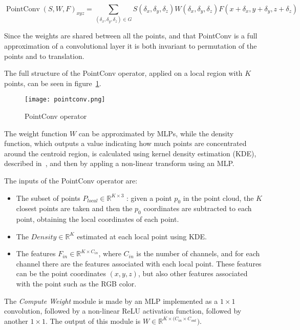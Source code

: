 \begin{equation}
    \operatorname{PointConv} (S, W, F)_{x y z}=
\sum_{\left(\delta_{x}, \delta_{y}, \delta_{z}\right) \in G} S\left(\delta_{x}, \delta_{y}, \delta_{z}\right) W\left(\delta_{x}, \delta_{y}, \delta_{z}\right) F\left(x+\delta_{x}, y+\delta_{y}, z+\delta_{z}\right)
\end{equation}

Since the weights are shared between all the points, and that PointConv is a full approximation of a convolutional layer it is both invariant to permutation of the points and to translation.

The full structure of the PointConv operator, applied on a local region with $K$ points, can be seen in figure~\ref{fig:pointconvOperator}.

\begin{figure}[ht]
    \centering
    \texttt{[image: pointconv.png]}
    \caption{PointConv operator~\cite{PointConv}}
    \label{fig:pointconvOperator}
\end{figure}

The weight function $W$ can be approximated by MLPs, while the density function, which outputs a value indicating how much points are concentrated around the centroid region, is calculated using kernel density estimation (KDE), described in~\cite{Turlach_bandwidthselection}, and then by appling a non-linear transform using an MLP.

The inputs of the PointConv operator are:

\begin{itemize}
    \item The subset of points $P_{local} \in \mathbb{R}^{K \times 3}$ : given a point $p_0$ in the point cloud, the $K$ closest points are taken and then the $p_0$ coordinates are subtracted to each point, obtaining the local coordinates of each point.
    \item The $ Density \in \mathbb{R} ^{K}$ estimated at each local point using KDE.
    \item The features $F_{in} \in \mathbb{R}^{K \times C_{in}}$, where $C_{in}$ is the number of channels, and for each channel there are the features associated with each local point. These features can be the point coordinates $(x, y, z)$, but also other features associated with the point such as the RGB color.
\end{itemize}

The \textit{Compute Weight} module is made by an MLP implemented as a $1 \times 1$ convolution, followed by a non-linear ReLU activation function, followed by another $1 \times 1$. The output of this module is $W \in \mathbb{R}^{K \times (C_{in} \times C_{out}})$.

